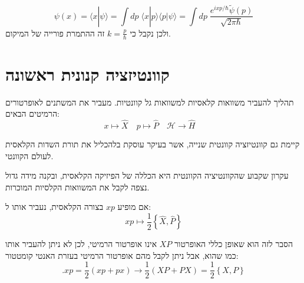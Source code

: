 \documentclass{tstextbook}
\begin{document}
\begin{proposition}
$$\psi(x)=\langle x|\psi\rangle=\int\!\!d p\;\langle x|p\rangle\langle p|\psi\rangle=\int\!\!d p\;{\frac{e^{i x p/\hbar}\tilde{\psi}(p)}{\sqrt{2\pi\hbar}}}$$
ולכן נקבל כי \(k=\frac{p}{\hbar}\) זה ההתמרת פורייה של המיקום.

\end{proposition}
\section{קוונטיזציה קנונית ראשונה}

\begin{definition}
תהליך להעביר משוואות קלאסיות למשוואות גל קוונטיות. מעביר את המשתנים לאופרטורים הרמיטים הבאים:
$$x\mapsto \hat{X}\quad p\mapsto \hat{P}\quad \mathcal{H}\to \hat{H}\quad $$

\end{definition}
\begin{remark}
קיימת גם קוונטיזציה קוונטית שנייה, אשר בעיקר עוסקת בלהכליל את תורת השדות הקלאסית לעולם הקוונטי.

\end{remark}
\begin{definition}
עקרון שקבוע שהקוונטיציה הקוונטית היא הכללה של הפיזיקה הקלאסית, ובקנה מידה גדול נצפה לקבל את המשוואות הקלסיות המוכרות.

\end{definition}
\begin{proposition}
אם מופיע \(xp\) בצורה הקלאסית, נעביר אותו ל:
$$xp\mapsto \frac{1}{2}\left\{  \hat{X},\hat{P}  \right\}$$

\end{proposition}
הסבר לזה הוא שאופן כללי האופרטור \(XP\) אינו אופרטור הרמיטי, לכן לא ניתן להעביר אותו כמו שהוא, אבל ניתן לקבל מהם אופרטור הרמיטי בעזרת האנטי קומטטור:
$$.x p={\frac{1}{2}}\left(x p+p x\right)\longrightarrow{\frac{1}{2}}\left(X P+P X\right)={\frac{1}{2}}\left\{X,P\right\}$$
\end{document}
